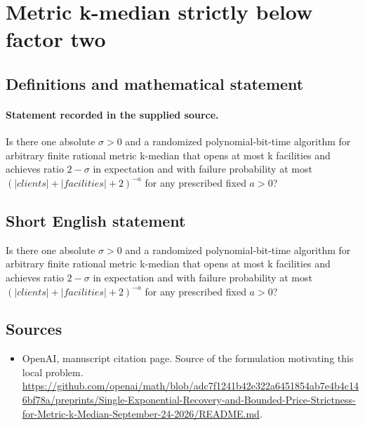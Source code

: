 \documentclass[11pt]{article}
\begin{document}
\section*{Metric k-median strictly below factor two}\label{statement}
\subsection{Definitions and mathematical statement}
\paragraph{Statement recorded in the supplied source.}
Is there one absolute $\sigma >0$ and a randomized polynomial-bit-time algorithm for arbitrary finite rational metric k-median that opens at most k facilities and achieves ratio $2-\sigma $ in expectation and with failure probability at most $(|clients|+|facilities|+2)^{-a}$ for any prescribed fixed $a>0$?
\subsection{Short English statement}
Is there one absolute $\sigma >0$ and a randomized polynomial-bit-time algorithm for arbitrary finite rational metric k-median that opens at most k facilities and achieves ratio $2-\sigma $ in expectation and with failure probability at most $(|clients|+|facilities|+2)^{-a}$ for any prescribed fixed $a>0$?
\subsection{Sources}
\begin{itemize}
\item[S1] OpenAI, manuscript citation page. Source of the formulation motivating this local problem.
\url{https://github.com/openai/math/blob/adc7f1241b42e322a6451854ab7e4b4c146bf78a/preprints/Single-Exponential-Recovery-and-Bounded-Price-Strictness-for-Metric-k-Median-September-24-2026/README.md}.
\end{itemize}
\end{document}
